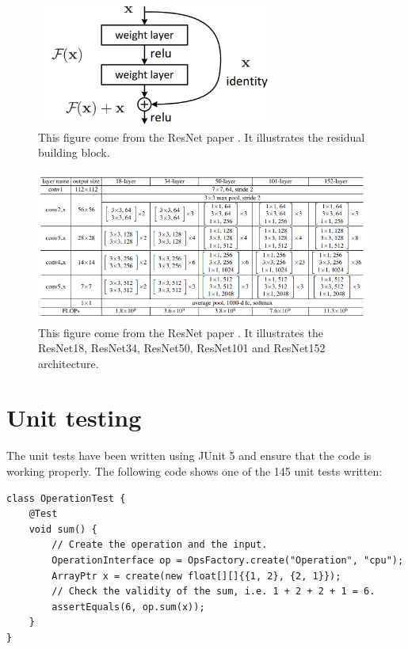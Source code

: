 \documentclass[11pt]{report}
\begin{document}
\begin{figure}[h]\label{fig:resblock}
\centering
\includegraphics[width=8cm, height=4cm]{resblock}
\caption[Residual block]{This figure come from the ResNet paper \cite{DBLP:conf/cvpr/HeZRS16}. It illustrates the residual building block.}
\end{figure}

\begin{figure}[h]\label{fig:resnet}
\centering
\includegraphics[width=11cm, height=5cm]{resnet}
\caption[ResNet architecture]{This figure come from the ResNet paper \cite{DBLP:conf/cvpr/HeZRS16}. It illustrates the ResNet18, ResNet34, ResNet50, ResNet101 and ResNet152 architecture.}
\end{figure}

\newpage
\section{Unit testing}

The unit tests have been written using JUnit 5 and ensure that the code is working properly. The following code shows one of the 145 unit tests written:

\begin{verbatim}
class OperationTest {
    @Test
    void sum() {
        // Create the operation and the input.
        OperationInterface op = OpsFactory.create("Operation", "cpu");
        ArrayPtr x = create(new float[][]{{1, 2}, {2, 1}});
        // Check the validity of the sum, i.e. 1 + 2 + 2 + 1 = 6.
        assertEquals(6, op.sum(x));
    }
}
\end{verbatim}
\end{document}
